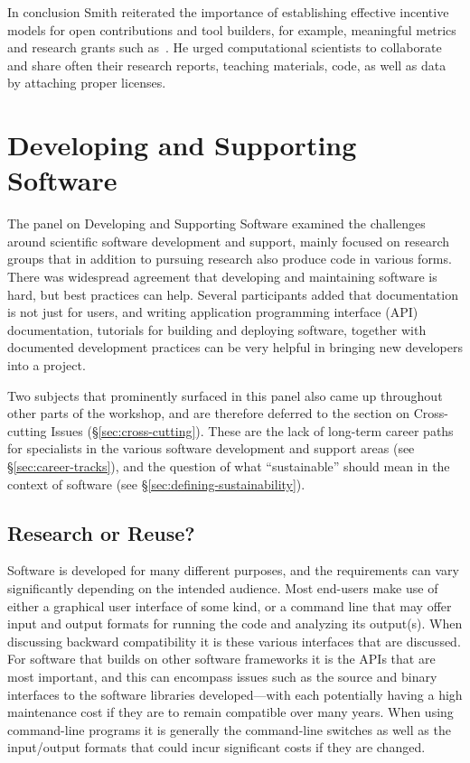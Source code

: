\documentclass[11pt, oneside]{amsart}
\newcommand{\note}[1]{ {\textcolor{red}    { #1 }}}
\begin{document}
In conclusion Smith reiterated the importance of establishing
effective incentive models for open contributions and tool builders,
for example, meaningful metrics and research grants such
as~\cite{NSF_software_vision}. He urged computational scientists to
collaborate and share often their research reports, teaching
materials, code, as well as data by attaching proper licenses.

\section{Developing and Supporting Software} \label{sec:devel}%

The panel on Developing and Supporting Software examined the
challenges around scientific software development and support, mainly
focused on research groups that in addition to pursuing research also
produce code in various forms. There was widespread agreement that
developing and maintaining software is hard, but best practices can
help.  Several participants added that documentation is not just for
users, and writing application programming interface (API)
documentation, tutorials for building and deploying software, together
with documented development practices can be very helpful in bringing
new developers into a project.

Two subjects that prominently surfaced in this panel also came up
throughout other parts of the workshop, and are therefore deferred to
the section on Cross-cutting Issues (\S\ref{sec:cross-cutting}). These
are the lack of long-term career paths for specialists in the various
software development and support areas (see
\S\ref{sec:career-tracks}), and the question of what ``sustainable''
should mean in the context of software (see
\S\ref{sec:defining-sustainability}).

\subsection{Research or Reuse?}

Software is developed for many different purposes, and the
requirements can vary significantly depending on the intended
audience. Most end-users make use of either a graphical user interface
of some kind, or a command line that may offer input and output
formats for running the code and analyzing its output(s).  When
discussing backward compatibility it is these various interfaces that
are discussed. For software that builds on other software frameworks
it is the APIs that are most important, and this can encompass issues
such as the source and binary interfaces to the software libraries
developed---with each potentially having a high maintenance cost if
they are to remain compatible over many years. When using command-line
programs it is generally the command-line switches as well as the
input/output formats that could incur significant costs if they are
changed.
\end{document}
